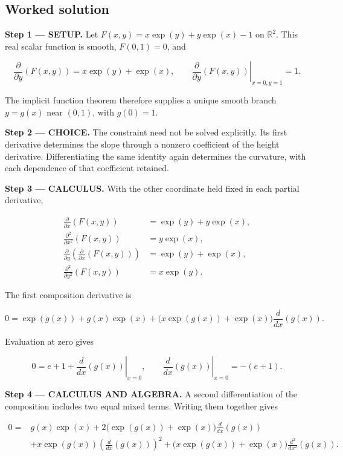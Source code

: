 \documentclass[11pt,oneside,openany]{book}
\begin{document}
\subsection*{Worked solution}

\textbf{Step 1 --- SETUP.} Let \(F(x,y)=x\exp(y)+y\exp(x)-1\) on \(\mathbb R^2\). This real scalar function is smooth, \(F(0,1)=0\), and

\[
\frac{\partial}{\partial y}\left(F(x,y)\right)=x\exp(y)+\exp(x),
\qquad
\left.\frac{\partial}{\partial y}\left(F(x,y)\right)\right|_{x=0,y=1}=1.
\]

The implicit function theorem therefore supplies a unique smooth branch \(y=g(x)\) near \((0,1)\), with \(g(0)=1\).

\begin{ChoiceStep}
\textbf{Step 2 --- CHOICE.} The constraint need not be solved explicitly. Its first derivative determines the slope through a nonzero coefficient of the height derivative. Differentiating the same identity again determines the curvature, with each dependence of that coefficient retained.

\end{ChoiceStep}
\textbf{Step 3 --- CALCULUS.} With the other coordinate held fixed in each partial derivative,

\[
\begin{aligned}
\frac{\partial}{\partial x}\left(F(x,y)\right)&=\exp(y)+y\exp(x),\\
\frac{\partial^2}{\partial x^2}\left(F(x,y)\right)&=y\exp(x),\\
\frac{\partial}{\partial y}\left(\frac{\partial}{\partial x}\left(F(x,y)\right)\right)
&=\exp(y)+\exp(x),\\
\frac{\partial^2}{\partial y^2}\left(F(x,y)\right)&=x\exp(y).
\end{aligned}
\]

The first composition derivative is

\[
0=\exp(g(x))+g(x)\exp(x)
+\bigl(x\exp(g(x))+\exp(x)\bigr)\frac{d}{dx}\left(g(x)\right).
\]

Evaluation at zero gives

\[
0=e+1+\left.\frac{d}{dx}\left(g(x)\right)\right|_{x=0},
\qquad
\left.\frac{d}{dx}\left(g(x)\right)\right|_{x=0}=-(e+1).
\]

\textbf{Step 4 --- CALCULUS AND ALGEBRA.} A second differentiation of the composition includes two equal mixed terms. Writing them together gives

\[
\begin{aligned}
0={}&g(x)\exp(x)
+2\bigl(\exp(g(x))+\exp(x)\bigr)\frac{d}{dx}\left(g(x)\right)\\
&+x\exp(g(x))\left(\frac{d}{dx}\left(g(x)\right)\right)^2
+\bigl(x\exp(g(x))+\exp(x)\bigr)\frac{d^2}{dx^2}\left(g(x)\right).
\end{aligned}
\]
\end{document}
